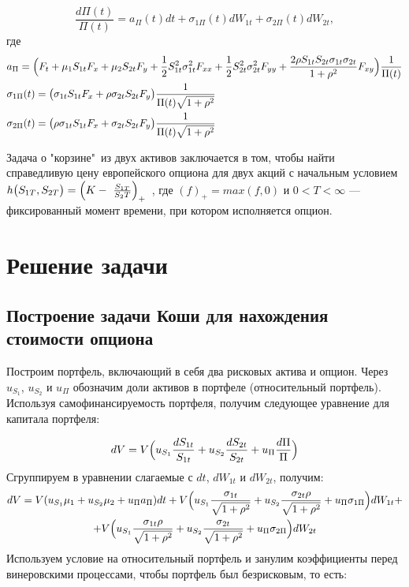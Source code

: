 \documentclass[a4paper, 12pt]{extreport}
\numberwithin{equation}{section}
\begin{document}
	\begin{equation}
		\frac{d\Pi(t)}{\Pi(t)} = a_{\Pi}(t)dt+\sigma_{1\Pi}(t)dW_{1t} + \sigma_{2\Pi}(t)dW_{2t},
	\end{equation}
	где 
	\begin{align*}
	&a_{\Pi}=\Bigl(F_t+\mu_1S_{1t}F_x+\mu_2S_{2t}F_y+\frac{1}{2}S_{1t}^2\sigma_{1t}^2F_{xx}+\frac{1}{2}S_{2t}^2\sigma_{2t}^2F_{yy}+\dfrac{2\rho S_{1t} S_{2t} \sigma_{1t} \sigma_{2t}}{1+\rho^2}F_{xy}\Bigr)\frac{1}{\Pi(t)}
	\\
	&\sigma_{1\Pi}(t)=\bigl(\sigma_{1t}S_{1t}F_x+\rho\sigma_{2t}S_{2t}F_y\bigr)\frac{1}{\Pi(t)\sqrt{1+\rho^2}}
	\\
	&\sigma_{2\Pi}(t)=\bigl(\rho\sigma_{1t}S_{1t}F_x+\sigma_{2t}S_{2t}F_y\bigr)\frac{1}{\Pi(t)\sqrt{1+\rho^2}}
	\end{align*}
	
	
	Задача о "корзине"\ из двух активов заключается в том, чтобы найти справедливую цену европейского опциона для двух акций с начальным условием \newline $h\bigl(S_{1T},S_{2T}\bigr)=\Bigl(K-~\frac{S_{1T}}{S_2T}\Bigr)_{+}$~, где $(f)_{+}=max(f,0)$ и $0<T<\infty$ --- фиксированный момент времени, при котором исполняется опцион.
	
	\newpage
	\chapter{Решение задачи}
	\section{Построение задачи Коши для нахождения стоимости опциона }
	
	
	Построим портфель, включающий в себя два рисковых актива и опцион. Через $u_{S_1}$, $u_{S_2}$ и $u_{\Pi}$ обозначим доли активов в портфеле (относительный портфель). Используя самофинансируемость портфеля, получим следующее уравнение для капитала портфеля:
	
	$$dV=V\Bigl(u_{S_1}\frac{dS_{1t}}{S_{1t}}+u_{S_2}\frac{dS_{2t}}{S_{2t}}+u_{\Pi}\frac{d\Pi}{\Pi} \Bigr)$$
	Сгруппируем в уравнении слагаемые с $dt$, $dW_{1t}$ и $dW_{2t}$, получим:
	\begin{equation*}
		\begin{gathered}		
		dV=V(u_{S_1}\mu_1+u_{S_2}\mu_2+u_{\Pi}a_{\Pi})dt + V\Bigl(u_{S_1}\dfrac{\sigma_{1t}}{\sqrt{1+\rho^2}}+u_{S_2}\dfrac{\sigma_{2t}\rho}{\sqrt{1+\rho^2}}+u_{\Pi}\sigma_{1\Pi}\Bigr)dW_{1t}+\\+V\Bigl(u_{S_1}\dfrac{\sigma_{1t}\rho}{\sqrt{1+\rho^2}}+u_{S_2}\dfrac{\sigma_{2t}}{\sqrt{1+\rho^2}}+u_{\Pi}\sigma_{2\Pi}\Bigr)dW_{2t}
		\end{gathered}
	\end{equation*}	
	Используем условие на относительный портфель и занулим коэффициенты перед винеровскими процессами, чтобы портфель был безрисковым, то есть:
	
\end{document}
